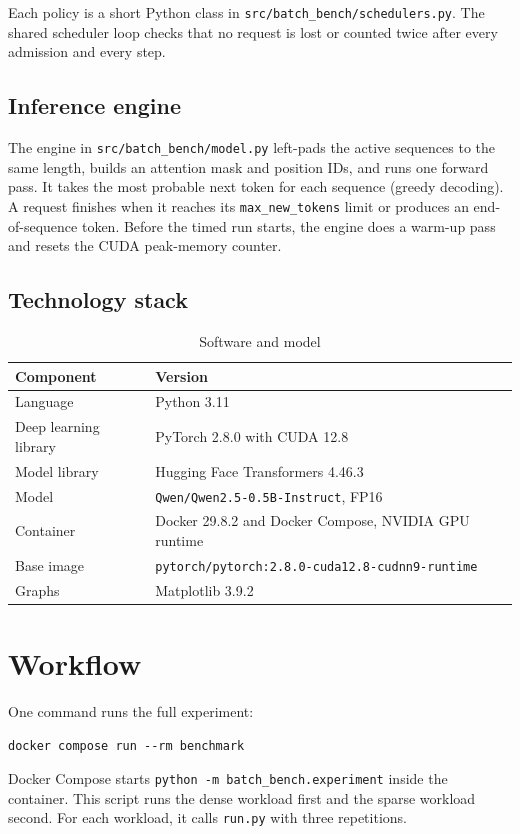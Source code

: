 \documentclass[12pt,a4paper]{article}
\begin{document}
Each policy is a short Python class in \texttt{src/batch\_bench/schedulers.py}. The shared scheduler loop checks that no request is lost or counted twice after every admission and every step.

\subsection{Inference engine}
The engine in \texttt{src/batch\_bench/model.py} left-pads the active sequences to the same length, builds an attention mask and position IDs, and runs one forward pass. It takes the most probable next token for each sequence (greedy decoding). A request finishes when it reaches its \texttt{max\_new\_tokens} limit or produces an end-of-sequence token. Before the timed run starts, the engine does a warm-up pass and resets the CUDA peak-memory counter.

\subsection{Technology stack}
\begin{table}[H]
\centering
\caption{Software and model}
\begin{tabular}{ll}
\toprule
\textbf{Component} & \textbf{Version} \\
\midrule
Language & Python 3.11 \\
Deep learning library & PyTorch 2.8.0 with CUDA 12.8 \\
Model library & Hugging Face Transformers 4.46.3 \\
Model & \texttt{Qwen/Qwen2.5-0.5B-Instruct}, FP16 \\
Container & Docker 29.8.2 and Docker Compose, NVIDIA GPU runtime \\
Base image & \texttt{pytorch/pytorch:2.8.0-cuda12.8-cudnn9-runtime} \\
Graphs & Matplotlib 3.9.2 \\
\bottomrule
\end{tabular}
\end{table}

\section{Workflow}
One command runs the full experiment:
\begin{verbatim}
docker compose run --rm benchmark
\end{verbatim}

Docker Compose starts \texttt{python -m batch\_bench.experiment} inside the container. This script runs the dense workload first and the sparse workload second. For each workload, it calls \texttt{run.py} with three repetitions.
\end{document}
